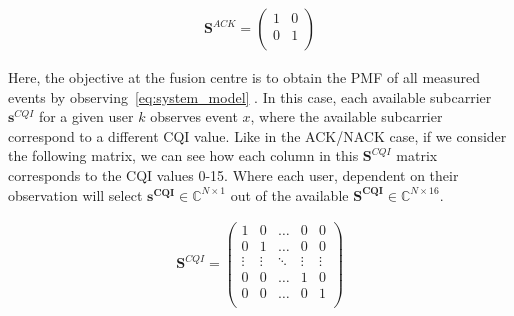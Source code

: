 \documentclass{article}
\begin{document}
\begin{align}
    \textbf{S}^{ACK} = 
    \begin{pmatrix}
    1 & 0\\
    0 & 1 \\
    \end{pmatrix}
    \label{fig:sig_mat_ack}
\end{align}


Here, the objective at the fusion centre is to obtain the PMF of all measured events by observing~\ref{eq:system_model} . In this case, each available subcarrier $\textbf{s}^{CQI}$ for a given user $k$ observes event $x$, where the available subcarrier correspond to a different CQI value. Like in the ACK/NACK case, if we consider the following matrix, we can see how each column in this $\textbf{S}^{CQI}$ matrix corresponds to the CQI values 0-15.  Where each user, dependent on their observation will select $\boldsymbol{s^{CQI}} \in \mathbb{C}^{N \times 1}$ out of the available  $\boldsymbol{S^{CQI}} \in \mathbb{C}^{N \times 16}$. 







\begin{align}
    \textbf{S}^{CQI} = 
    \begin{pmatrix}
     1 & 0 & \hdots & 0 & 0\\
    0 & 1 & \hdots & 0 & 0 \\
    \vdots & \vdots & \ddots & \vdots & \vdots \\
    0 & 0 & \hdots & 1 & 0 \\
    0 & 0 & \hdots & 0 & 1 \\
    \end{pmatrix}
    \label{fig:sig_mat_cqi}
\end{align}
\end{document}
